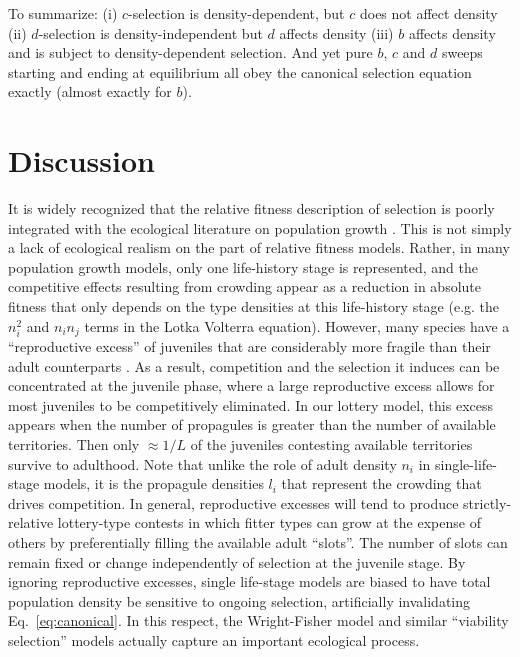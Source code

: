 \documentclass[11pt]{article}
\begin{document}
To summarize: (i) $c$-selection is density-dependent, but $c$ does not affect density (ii) $d$-selection is density-independent but $d$ affects density (iii) $b$ affects density and is subject to density-dependent selection. And yet pure $b$, $c$ and $d$ sweeps starting and ending at equilibrium all obey the canonical selection equation exactly (almost exactly for $b$).


\section*{Discussion}

It is widely recognized that the relative fitness description of selection is poorly integrated with the ecological literature on population growth \citep{mallet_2012}. This is not simply a lack of ecological realism on the part of relative fitness models. Rather, in many population growth models, only one life-history stage is represented, and the competitive effects resulting from crowding appear as a reduction in absolute fitness that only depends on the type densities at this life-history stage (e.g. the $n_i^2$ and $n_in_j$ terms in the Lotka Volterra equation). However, many species have a ``reproductive excess'' of juveniles that are considerably more fragile than their adult counterparts \citep{chesson_1983,turner1968population,kimura1969natural,nei1971fertility}. As a result, competition and the selection it induces can be concentrated at the juvenile phase, where a large reproductive excess allows for most juveniles to be competitively eliminated. In our lottery model, this excess appears when the number of propagules is greater than the number of available territories. Then only $\approx 1/L$ of the juveniles contesting available territories survive to adulthood. Note that unlike the role of adult density $n_i$ in single-life-stage models, it is the propagule densities $l_i$ that represent the crowding that drives competition. In general, reproductive excesses will tend to produce strictly-relative lottery-type contests in which fitter types can grow at the expense of others by preferentially filling the available adult ``slots''. The number of slots can remain fixed or change independently of selection at the juvenile stage. By ignoring reproductive excesses, single life-stage models are biased to have total population density be sensitive to ongoing selection, artificially invalidating Eq.~\eqref{eq:canonical}. In this respect, the Wright-Fisher model and similar ``viability selection'' models actually capture an important ecological process.
\end{document}
